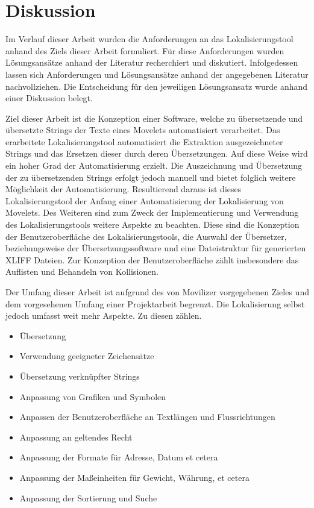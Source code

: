 \chapter{Diskussion}
Im Verlauf dieser Arbeit wurden die Anforderungen an das Lokalisierungstool anhand des Ziels dieser Arbeit formuliert. Für diese Anforderungen wurden Lösungsansätze anhand der Literatur recherchiert und diskutiert. Infolgedessen lassen sich Anforderungen und Lösungsansätze anhand der angegebenen Literatur nachvollziehen. Die Entscheidung für den jeweiligen Lösungsansatz wurde anhand einer Diskussion belegt.
\par
Ziel dieser Arbeit ist die Konzeption einer Software, welche zu übersetzende und übersetzte Strings der Texte eines Movelets automatisiert verarbeitet. Das erarbeitete Lokalisierungstool automatisiert die Extraktion ausgezeichneter Strings und das Ersetzen dieser durch deren Übersetzungen. Auf diese Weise wird ein hoher Grad der Automatisierung erzielt. Die Auszeichnung und Übersetzung der zu übersetzenden Strings erfolgt jedoch manuell und bietet folglich weitere Möglichkeit der Automatisierung. Resultierend daraus ist dieses Lokalisierungstool der Anfang einer Automatisierung der Lokalisierung von Movelets. Des Weiteren sind zum Zweck der Implementierung und Verwendung des Lokalisierungstools weitere Aspekte zu beachten. Diese sind die Konzeption der Benutzeroberfläche des Lokalisierungstools, die Auswahl der Übersetzer, beziehungsweise der Übersetzungssoftware und eine Dateistruktur für generierten \ac{XLIFF} Dateien. Zur Konzeption der Benutzeroberfläche zählt insbesondere das Auflisten und Behandeln von Kollisionen.
\par
Der Umfang dieser Arbeit ist aufgrund des von Movilizer vorgegebenen Zieles und dem vorgesehenen Umfang einer Projektarbeit begrenzt. Die Lokalisierung selbst jedoch umfasst weit mehr Aspekte. Zu diesen zählen.
\begin{itemize}
	\item Übersetzung
	\item Verwendung geeigneter Zeichensätze
	\item Übersetzung verknüpfter Strings
	\item Anpassung von Grafiken und Symbolen
	\item Anpassen der Benutzeroberfläche an Textlängen und Flussrichtungen
	\item Anpassung an geltendes Recht
	\item Anpassung der Formate für Adresse, Datum et cetera
	\item Anpassung der Maßeinheiten für Gewicht, Währung, et cetera
	\item Anpassung der Sortierung und Suche
\end{itemize}
